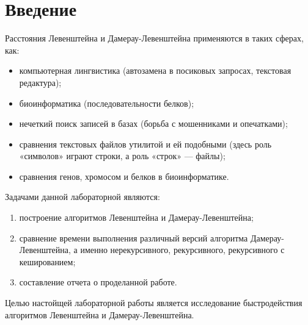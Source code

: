\chapter*{Введение}

Расстояния Левенштейна и Дамерау-Левенштейна применяются в таких сферах, как: 
\begin{itemize}
	\item компьютерная лингвистика (автозамена в посиковых запросах, текстовая редактура);
	\item биоинформатика (последовательности белков);
	\item нечеткий поиск записей в базах (борьба с мошенниками и опечатками);
	\item сравнения текстовых файлов утилитой  и ей подобными (здесь роль «символов» играют строки, а роль «строк» — файлы);
	\item сравнения генов, хромосом и белков в биоинформатике.
\end{itemize}


Задачами данной лабораторной являются:

\begin{enumerate}
	\item построение алгоритмов Левенштейна и Дамерау-Левенштейна;
	\item сравнение времени выполнения различный версий алгоритма Дамерау-Левенштейна, а именно нерекурсивного, рекурсивного, рекурсивного с кешированием;
	\item составление отчета о проделанной работе.
\end{enumerate}

Целью настойщей лабораторной работы является исследование быстродействия алгоритмов Левенштейна и Дамерау-Левенштейна.
